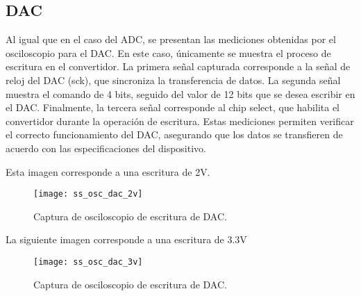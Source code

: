 \newpage     
\subsection{DAC}
Al igual que en el caso del ADC, se presentan las mediciones obtenidas por el osciloscopio para el DAC. En este caso, únicamente se muestra el proceso de escritura en el convertidor. La primera señal capturada corresponde a la señal de reloj del DAC (sck), que sincroniza la transferencia de datos. La segunda señal muestra el comando de 4 bits, seguido del valor de 12 bits que se desea escribir en el DAC. Finalmente, la tercera señal corresponde al chip select, que habilita el convertidor durante la operación de escritura. Estas mediciones permiten verificar el correcto funcionamiento del DAC, asegurando que los datos se transfieren de acuerdo con las especificaciones del dispositivo.


Esta imagen corresponde a una escritura de 2V.
            \begin{figure}[hbtp]
                \centering
                \texttt{[image: ss\_osc\_dac\_2v]}
                \caption{Captura de osciloscopio de escritura de DAC.}
                \label{fig:ss_osc_dac_2v}
            \end{figure}
            
            
La siguiente imagen corresponde a una escritura de 3.3V           
            \begin{figure}[hbtp]
                \centering
                \texttt{[image: ss\_osc\_dac\_3v]}
                \caption{Captura de osciloscopio de escritura de DAC.}
                \label{fig:ss_osc_dac_3v}
            \end{figure}   
            
\newpage                      
